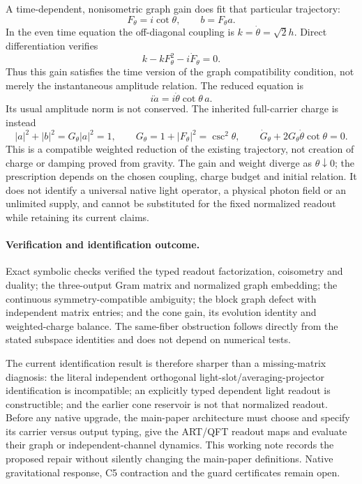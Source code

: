 \documentclass[11pt,a4paper]{article}
\begin{document}
A time-dependent, nonisometric graph gain does fit that particular
trajectory:
\[
 F_\theta=i\cot\theta,\qquad b=F_\theta a.
\]
In the even time equation the off-diagonal coupling is
$k=\dot\theta=\sqrt2h$. Direct differentiation verifies
\[
 k-kF_\theta^2-i\dot F_\theta=0.
\]
Thus this gain satisfies the time version of the graph compatibility
condition, not merely the instantaneous amplitude relation.
The reduced equation is
\[
 i\dot a=i\dot\theta\cot\theta\,a.
\]
Its usual amplitude norm is not conserved. The inherited full-carrier
charge is instead
\[
 |a|^2+|b|^2=G_\theta|a|^2=1,
 \qquad G_\theta=1+|F_\theta|^2=\csc^2\theta,
 \qquad \dot G_\theta+2G_\theta\dot\theta\cot\theta=0.
\]
This is a compatible weighted reduction of the existing trajectory,
not creation of charge or damping proved from gravity. The gain
and weight diverge as $\theta\downarrow0$; the prescription
depends on the chosen coupling, charge budget and initial relation.
It does not identify a universal native light operator, a physical
photon field or an unlimited supply, and cannot be substituted for
the fixed normalized readout while retaining its current claims.

\paragraph{Verification and identification outcome.}
Exact symbolic checks verified the typed readout factorization,
coisometry and duality; the three-output Gram matrix and normalized
graph embedding; the continuous symmetry-compatible ambiguity;
the block graph defect with independent matrix entries; and the
cone gain, its evolution identity and weighted-charge balance.
The same-fiber obstruction follows directly from the stated
subspace identities and does not depend on numerical tests.

The current identification result is therefore sharper than a
missing-matrix diagnosis: the literal independent orthogonal
light-slot/averaging-projector identification is incompatible;
an explicitly typed dependent light readout is constructible;
and the earlier cone reservoir is not that normalized readout.
Before any native upgrade, the main-paper architecture must choose
and specify its carrier versus output typing, give the ART/QFT
readout maps and evaluate their graph or independent-channel
dynamics. This working note records the proposed repair without
silently changing the main-paper definitions. Native gravitational
response, C5 contraction and the guard certificates remain open.
\end{document}
